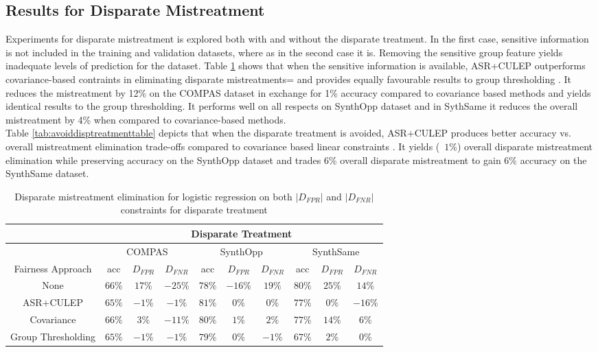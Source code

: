 \documentclass[runningheads]{llncs}
\begin{document}
\subsection{Results for Disparate Mistreatment}
Experiments for disparate mistreatment is explored both with and without the disparate treatment. In the first case, sensitive information is not included in the training and validation datasets, where as in the second case it is. Removing the sensitive group feature yields inadequate levels of prediction for the dataset. Table \ref{tab:disptreatmenttable} shows that when the sensitive information is available, ASR+CULEP outperforms covariance-based contraints in eliminating disparate mistreatments= and provides equally favourable results to group thresholding \cite{krasanakis2018adaptive}. It reduces the mistreatment by 12\% on the COMPAS dataset in exchange for 1\% accuracy compared to covariance based methods and yields identical results to the group thresholding. It performs well on all respects on SynthOpp dataset and in SythSame it reduces the overall mistreatment by 4\% when compared to covariance-based methods.\\
Table \ref{tab:avoiddisptreatmenttable} depicts that when the disparate treatment is avoided, ASR+CULEP produces better accuracy vs. overall mistreatment elimination trade-offs compared to covariance based linear constraints \cite{krasanakis2018adaptive}. It yields (~$1\%$) overall disparate mistreatment elimination while preserving accuracy on the SynthOpp dataset and trades $6\%$ overall disparate mistreatment to gain $6\%$ accuracy on the SynthSame dataset.
\begin{table}[!htbp]
      \centering
\begin{tabular}{|c|c|c|c|c|c|c|c|c|c|}
\hline
{} & \multicolumn{9}{c}{Disparate Treatment} \vline \\
\hline
{} & \multicolumn{3}{c|}{COMPAS} & \multicolumn{3}{c|}{SynthOpp} & \multicolumn{3}{c|}{SynthSame} \vline \\
\hline
Fairness Approach & acc & $D_{FPR}$ & $D_{FNR}$ & acc & $D_{FPR}$ & $D_{FNR}$ & acc & $D_{FPR}$ & $D_{FNR}$ \\
\hline
None & $66\%$ & $17\%$  & $-25\%$  & $78\%$  & $-16\%$  & $19\%$  & $80\%$  & $25\%$  & $14\%$  \\
\hline
ASR+CULEP & $65\%$ & $-1\%$  & $-1\%$  & $81\%$  & $0\%$  & $0\%$  & $77\%$  & $0\%$  & $-16\%$  \\
\hline
Covariance & $66\%$ & $3\%$  & $-11\%$  & $80\%$  & $1\%$  & $2\%$  & $77\%$  & $14\%$  & $6\%$  \\
\hline
Group Thresholding & $65\%$ & $-1\%$  & $-1\%$  & $79\%$  & $0\%$  & $-1\%$  & $67\%$  & $2\%$  & $0\%$  \\
\hline 
\end{tabular}
\\
\caption{Disparate mistreatment elimination for logistic regression on both $|D_{FPR}|$ and $|D_{FNR}|$ constraints for disparate treatment}
\label{tab:disptreatmenttable}
\end{table}
\end{document}
